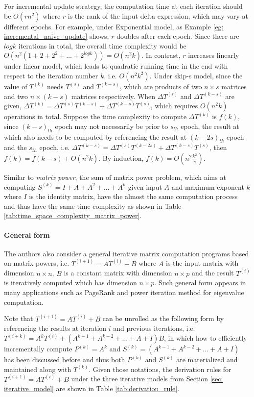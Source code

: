 For incremental update strategy, the computation time at each iteration should be $O(rn^2)$ where $r$ is the rank of the input delta expression, which may vary at different epochs. For example, under Exponential model, as Example \ref{eg: incremental_naive_update} shows, $r$ doubles after each epoch. Since there are $logk$ iterations in total, the overall time complexity would be $O(n^2(1+2+2^2+\dots+2^{logk})) = O(n^2k)$. In contrast, $r$ increases linearly under linear model, which leads to quadratic running time in the end with respect to the iteration number $k$, i.e. $O(n^2k^2)$. Under skip-s model, since the value of $T^{(k)}$ needs $T^{(s)}$ and $T^{(k-s)}$, which are products of two $n\times s$ matrices and two $n\times (k-s)$ matrices respectively. When $\Delta T^{(s)}$ and $\Delta T^{(k-s)}$ are given, $\Delta T^{(k)} = \Delta T^{(s)}T^{(k-s)} + \Delta T^{(k-s)}T^{(s)}$, which requires $O(n^2k)$ operations in total. Suppose the time complexity to compute $\Delta T^{(k)}$ is $f(k)$, since $(k-s)_{th}$ epoch may not necessarily be prior to $s_{th}$ epoch, the result at which also needs to be computed by referencing the result at $(k-2s)_{th}$ epoch and the $s_{th}$ epoch, i.e. $\Delta T^{(k-s)} = \Delta T^{(s)}T^{(k-2s)} + \Delta T^{(k-s)}T^{(s)}$, then $f(k) = f(k-s) + O(n^2k)$. By induction, $f(k) = O(n^2\frac{k^2}{s})$.

Similar to {\em matrix power}, the sum of matrix power problem, which aims at computing $S^{(k)} = I + A + A^2 + \dots + A^k$ given input $A$ and maximum exponent $k$ where $I$ is the identity matrix, have the almost the same computation process and thus have the same time complexity as shown in Table \ref{tab:time_space_complexity_matrix_power}. 

\paragraph{General form} The authors also consider a general iterative matrix computation programs based on matrix powers, i.e. $T^{(i+1)} = AT^{(i)} + B$ where $A$ is the input matrix with dimension $n \times n$, $B$ is a constant matrix with dimension $n \times p$ and the result $T^{(i)}$ is iteratively computed which has dimension $n \times p$. Such general form appears in many applications such as PageRank and power iteration method for eigenvalue computation. 

Note that $T^{(i+1)} = AT^{(i)} + B$ can be unrolled as the following form by referencing the results at iteration $i$ and previous iterations, i.e. $T^{(i+k)} = A^kT^{(i)} + (A^{k-1} + A^{k-2} + \dots + A + I) B$, in which how to efficiently incrementally compute $P^{(k)} = A^k$ and $S^{(k)} = (A^{k-1} + A^{k-2} + \dots + A + I)$ has been discussed before and thus both $P^{(k)}$ and $S^{(k)}$ are materialized and maintained along with $T^{(k)}$. Given those notations, the derivation rules for $T^{(i+1)} = AT^{(i)} + B$ under the three iterative models from Section \ref{sec: iterative_model} are shown in Table \ref{tab:derivation_rule}.


